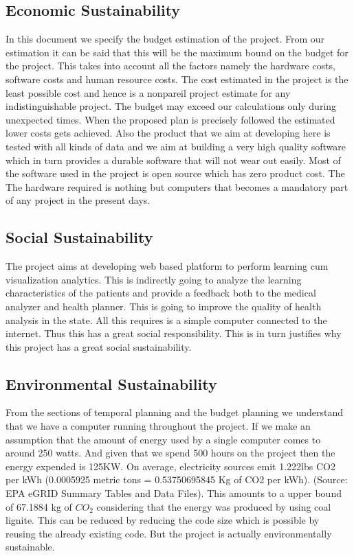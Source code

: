 \subsection{Economic Sustainability}
 In this document we specify
the budget estimation of the project. From our estimation it can be said that this will be the
maximum bound on the budget for the project. This takes into account all the factors namely
the hardware costs, software costs and human resource costs. The cost estimated in the project is the least possible cost and hence is a nonpareil project estimate for any indistinguishable project. The budget
may exceed our calculations only during unexpected times. When the proposed plan is precisely followed the estimated lower costs gets achieved. 
Also the product that we aim at developing here is tested with all kinds of data and we aim at
building a very high quality software which in turn provides a durable software that will not
wear out easily.  Most of the software used in the project is open source which has zero product cost. The The hardware required is nothing but computers that becomes a mandatory part
of any project in the present days.

\subsection{Social Sustainability}
The project aims at developing web based platform to perform learning cum visualization
analytics. This is indirectly going to analyze the learning characteristics of the patients and
provide a feedback both to the medical analyzer and health planner. This is going to improve
the quality of health analysis in the state. All this requires is a simple computer connected to
the internet.  Thus this has a great social responsibility. This is in
turn justifies why this project has a great social sustainability.

\subsection{Environmental Sustainability}
From the sections of temporal planning and the budget planning we understand that we have a
computer running throughout the project. If we make an assumption that the amount of
energy used by a single computer comes to around 250 watts. And given that we spend 500
hours on the project then the energy expended is 125KW.  On average, electricity sources emit 1.222lbs CO2 per kWh (0.0005925 metric tons = 0.53750695845 Kg of CO2 per kWh). (Source: EPA eGRID Summary Tables and Data Files). This amounts to a upper bound of 67.1884 kg of
$CO_2$ considering that the energy was produced by using coal lignite. This can be reduced
by reducing the code size which is possible by reusing the already existing code. But the project
is actually environmentally sustainable.


